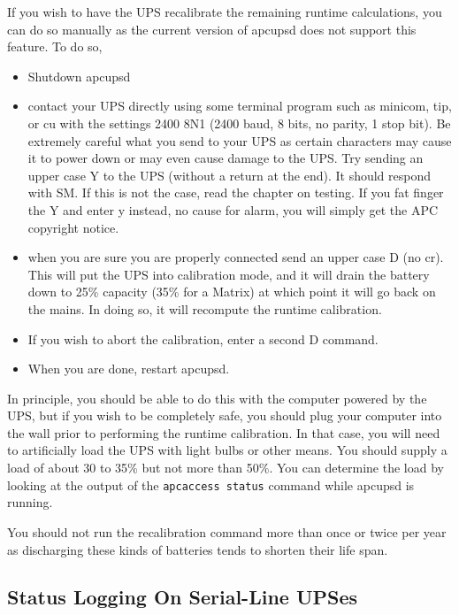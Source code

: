 {{{{{{{{{If you wish to have the UPS recalibrate the remaining runtime calculations,
you can do so manually as the current version of apcupsd does not support this
feature. To do so,  

\begin{itemize}
\item Shutdown apcupsd  
\item contact your UPS directly using some terminal program such as minicom,
   tip, or cu with the settings 2400 8N1 (2400 baud, 8 bits, no parity, 1 stop
   bit). Be extremely careful what you send to your UPS as certain characters may
cause it to power down or may even cause damage to the UPS. Try sending an
upper case Y to the UPS (without a return at the end). It should respond with
SM. If this is not the case, read the chapter on testing. If you fat finger
the Y and enter y instead, no cause for alarm, you will simply get the APC
copyright notice.  
\item when you are sure you are properly connected send an upper case D (no
   cr). This will put the UPS into calibration mode, and it will drain the
   battery down to 25\% capacity (35\% for a Matrix) at which point it will go
back on the mains. In doing so, it will recompute the runtime calibration.  
\item If you wish to abort the calibration, enter a second D command.  
\item When you are done, restart apcupsd. 
   \end{itemize}

In principle, you should be able to do this with the computer powered by the
UPS, but if you wish to be completely safe, you should plug your computer into
the wall prior to performing the runtime calibration. In that case, you will
need to artificially load the UPS with light bulbs or other means. You should
supply a load of about 30 to 35\% but not more than 50\%. You can determine
the load by looking at the output of the {\tt apcaccess status} command while
apcupsd is running.  

You should not run the recalibration command more than once or twice per year
as discharging these kinds of batteries tends to shorten their life span. 

\label{Status-Logging-On-Serial_002dLine-UPSes}

\subsection*{Status Logging On Serial-Line UPSes}

}}}}}}}}}
